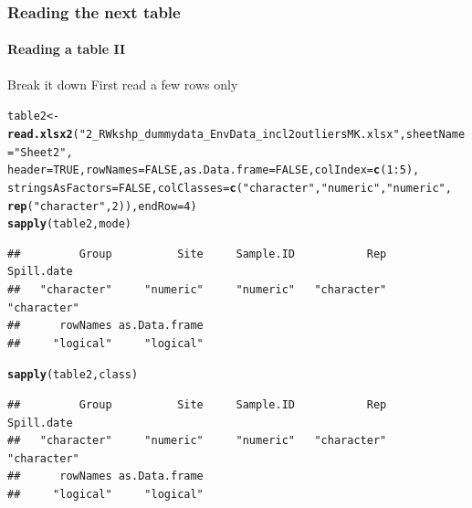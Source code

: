 \documentclass[12pt]{beamer}\usepackage[]{graphicx}\usepackage[]{color}
\makeatletter
\newcommand{\hlnum}[1]{\textcolor[rgb]{0.686,0.059,0.569}{#1}}%
\newcommand{\hlstr}[1]{\textcolor[rgb]{0.192,0.494,0.8}{#1}}%
\newcommand{\hlopt}[1]{\textcolor[rgb]{0,0,0}{#1}}%
\newcommand{\hlstd}[1]{\textcolor[rgb]{0.345,0.345,0.345}{#1}}%
\newcommand{\hlkwb}[1]{\textcolor[rgb]{0.69,0.353,0.396}{#1}}%
\newcommand{\hlkwc}[1]{\textcolor[rgb]{0.333,0.667,0.333}{#1}}%
\newcommand{\hlkwd}[1]{\textcolor[rgb]{0.737,0.353,0.396}{\textbf{#1}}}%
\newenvironment{kframe}{%
 \def\at@end@of@kframe{}%
 \ifinner\ifhmode%
  \def\at@end@of@kframe{\end{minipage}}%
  \begin{minipage}{\columnwidth}%
 \fi\fi%
 \def\FrameCommand##1{\hskip\@totalleftmargin \hskip-\fboxsep
 \colorbox{shadecolor}{##1}\hskip-\fboxsep
     \hskip-\linewidth \hskip-\@totalleftmargin \hskip\columnwidth}%
 \MakeFramed {\advance\hsize-\width
   \@totalleftmargin\z@ \linewidth\hsize
   \@setminipage}}%
 {\par\unskip\endMakeFramed%
 \at@end@of@kframe}
\newenvironment{knitrout}{}{} %
\makeatother
\begin{document}
\begin{frame}[fragile]
  \frametitle{Reading the next table}
  \framesubtitle{Reading a table II}
\begin{block}{Break it down}
First read a few rows only
\end{block}
\begin{small}
\begin{knitrout}
\color{fgcolor}\begin{kframe}
\begin{alltt}
\hlstd{table2} \hlkwb{<-} \hlkwd{read.xlsx2}\hlstd{(}\hlstr{"2_R Wkshp_dummy data_Env Data_incl2outliersMK.xlsx"}\hlstd{,} \hlkwc{sheetName} \hlstd{=} \hlstr{"Sheet2"}\hlstd{,}
    \hlkwc{header} \hlstd{=} \hlnum{TRUE}\hlstd{,} \hlkwc{rowNames} \hlstd{=} \hlnum{FALSE}\hlstd{,} \hlkwc{as.Data.frame} \hlstd{=} \hlnum{FALSE}\hlstd{,} \hlkwc{colIndex} \hlstd{=} \hlkwd{c}\hlstd{(}\hlnum{1}\hlopt{:}\hlnum{5}\hlstd{),}
    \hlkwc{stringsAsFactors} \hlstd{=} \hlnum{FALSE}\hlstd{,} \hlkwc{colClasses} \hlstd{=} \hlkwd{c}\hlstd{(}\hlstr{"character"}\hlstd{,} \hlstr{"numeric"}\hlstd{,} \hlstr{"numeric"}\hlstd{,}
        \hlkwd{rep}\hlstd{(}\hlstr{"character"}\hlstd{,} \hlnum{2}\hlstd{)),} \hlkwc{endRow} \hlstd{=} \hlnum{4}\hlstd{)}
\hlkwd{sapply}\hlstd{(table2, mode)}
\end{alltt}
\begin{verbatim}
##         Group          Site     Sample.ID           Rep    Spill.date 
##   "character"     "numeric"     "numeric"   "character"   "character" 
##      rowNames as.Data.frame 
##     "logical"     "logical"
\end{verbatim}
\begin{alltt}
\hlkwd{sapply}\hlstd{(table2, class)}
\end{alltt}
\begin{verbatim}
##         Group          Site     Sample.ID           Rep    Spill.date 
##   "character"     "numeric"     "numeric"   "character"   "character" 
##      rowNames as.Data.frame 
##     "logical"     "logical"
\end{verbatim}
\end{kframe}
\end{knitrout}
\end{small}
\clearpage
\end{frame}
\end{document}
